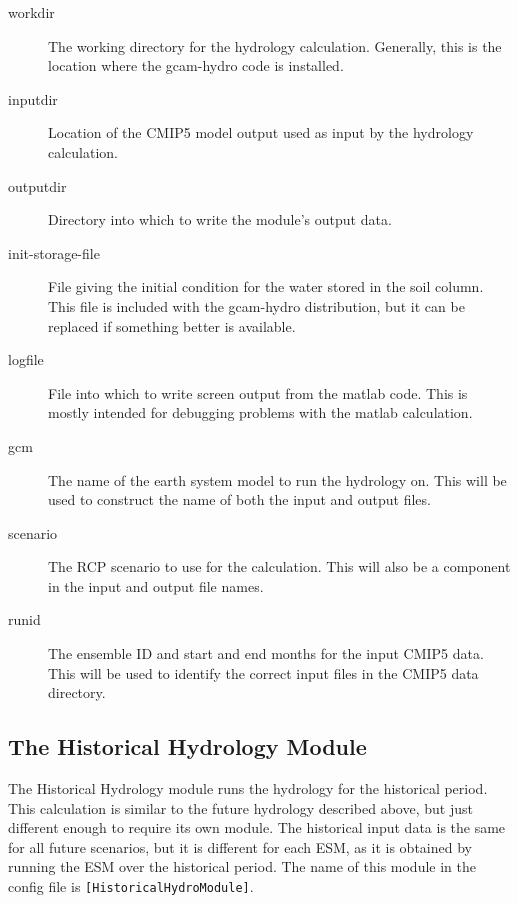 \documentclass[11pt]{article}
\begin{document}
\begin{description}
\item[workdir] The working directory for the hydrology calculation.
  Generally, this is the location where the gcam-hydro code is
  installed.
\item[inputdir] Location of the CMIP5 model output used as input by the
  hydrology calculation.
\item[outputdir] Directory into which to write the module's output
  data.
\item[init-storage-file] File giving the initial condition for the
  water stored in the soil column.  This file is included with the
  gcam-hydro distribution, but it can be replaced if something better
  is available.
\item[logfile] File into which to write screen output from the matlab
  code.  This is mostly intended for debugging problems with the
  matlab calculation.
\item[gcm] The name of the earth system model to run the hydrology
  on.  This will be used to construct the name of both the input and
  output files.
\item[scenario] The RCP scenario to use for the calculation.  This
  will also be a component in the input and output file names.
\item[runid] The ensemble ID and start and end months for the input
  CMIP5 data.  This will be used to identify the correct input files
  in the CMIP5 data directory.
\end{description}

\subsection{The Historical Hydrology Module}
The Historical Hydrology module runs the hydrology for the historical
period.  This calculation is similar to the future hydrology described
above, but just different enough to require its own module.  The
historical input data is the same for all future scenarios, but it is
different for each ESM, as it is obtained by running the ESM over the
historical period.  The name of this module in the config file is
\texttt{[HistoricalHydroModule]}.
\end{document}
